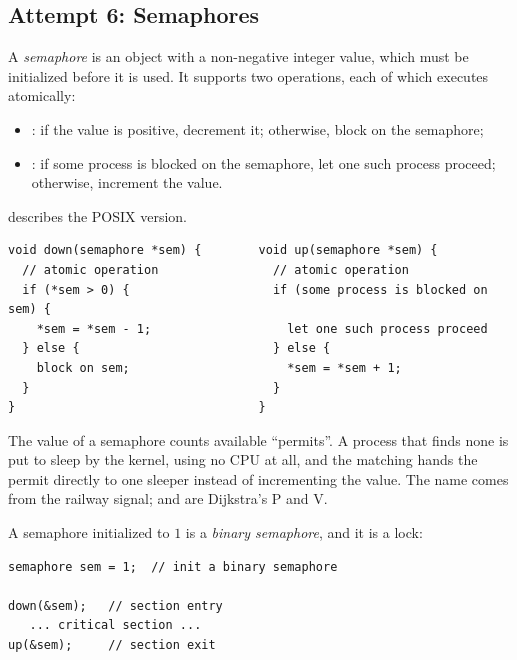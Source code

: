 \subsection{Attempt 6: Semaphores}

\begin{definition}[Semaphore]
  A \emph{semaphore} is an object with a non-negative integer value, which must be initialized before it is used. It supports two operations, each of which executes atomically:
  \begin{itemize}
    \item {}: if the value is positive, decrement it; otherwise, block on the semaphore;
    \item {}: if some process is blocked on the semaphore, let one such process proceed; otherwise, increment the value.
  \end{itemize}
   describes the POSIX version.
\end{definition}

\begin{lstlisting}
void down(semaphore *sem) {        void up(semaphore *sem) {
  // atomic operation                // atomic operation
  if (*sem > 0) {                    if (some process is blocked on sem) {
    *sem = *sem - 1;                   let one such process proceed
  } else {                           } else {
    block on sem;                      *sem = *sem + 1;
  }                                  }
}                                  }
\end{lstlisting}
The value of a semaphore counts available ``permits''. A process that finds none is put to sleep by the kernel, using no CPU at all, and the matching  hands the permit directly to one sleeper instead of incrementing the value. The name comes from the railway signal;  and  are Dijkstra's P and V.

A semaphore initialized to $1$ is a \emph{binary semaphore}, and it is a lock:
\begin{lstlisting}
semaphore sem = 1;  // init a binary semaphore

down(&sem);   // section entry
   ... critical section ...
up(&sem);     // section exit
\end{lstlisting}

